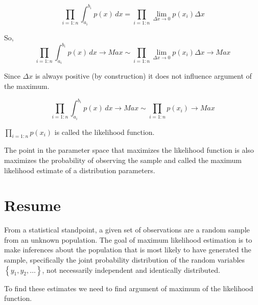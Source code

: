 \documentclass{article}
\begin{document}
$$ \prod_{i=1:n}\int_{a_i}^{b_i} p(x) \,dx  = \prod_{i=1:n}\lim_{\Delta x \rightarrow 0} p(x_i)\Delta x$$

So, 
$$ \prod_{i=1:n}\int_{a_i}^{b_i} p(x) \,dx \rightarrow Max  \sim  \prod_{i=1:n}\lim_{\Delta x \rightarrow 0} p(x_i)\Delta x \rightarrow Max$$

Since $\Delta x$ is always positive (by construction) it does not influence argument of the maximum.

$$ \prod_{i=1:n}\int_{a_i}^{b_i} p(x) \,dx \rightarrow Max  \sim  \prod_{i=1:n} p(x_i) \rightarrow Max$$

$\prod_{i=1:n} p(x_i)$ is called the likelihood function.


 The point in the parameter space that maximizes the likelihood function is also maximizes the probability of observing the sample and called the maximum likelihood estimate of a distribution parameters.

\section{Resume}
From a statistical standpoint, a given set of observations are a random sample from an unknown population. The goal of maximum likelihood estimation is to make inferences about the population that is most likely to have generated the sample, specifically the joint probability distribution of the random variables ${\displaystyle \left\{y_{1},y_{2},\ldots \right\}}$, not necessarily independent and identically distributed. 

To find these estimates we need to find argument of maximum of the likelihood function.
\end{document}

